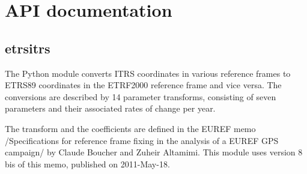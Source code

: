 \documentclass[a4paper,10pt,english]{sphinxmanual}
\begin{document}
\begin{sphinxVerbatim}[commandchars=\\\{\}]
  \PYG{p}{[}\PYG{p}{]}  \PYG{p}{[}\PYG{p}{]} \PYG{p}{[} \PYG{p}{[}\PYG{p}{]} \PYG{p}{]}
      \PYG{p}{[}  \PYG{p}{]}
     
      
\end{sphinxVerbatim}


\chapter{API documentation}
\label{\detokenize{api-docs:api-documentation}}\label{\detokenize{api-docs::doc}}

\section{etrsitrs}
\label{\detokenize{api-docs:etrsitrs}}\label{\detokenize{api-docs:module-etrsitrs}}
The  Python module converts ITRS coordinates in various
reference frames to ETRS89 coordinates in the ETRF2000 reference frame
and vice versa. The conversions are described by 14 parameter
transforms, consisting of seven parameters and their associated rates
of change per year.

The transform and the coefficients are defined in the EUREF memo
/Specifications for reference frame fixing in the analysis of a EUREF
GPS campaign/ by Claude Boucher and Zuheir Altamimi. This module
uses version 8 bis of this memo, published on 2011-May-18.
\end{document}
